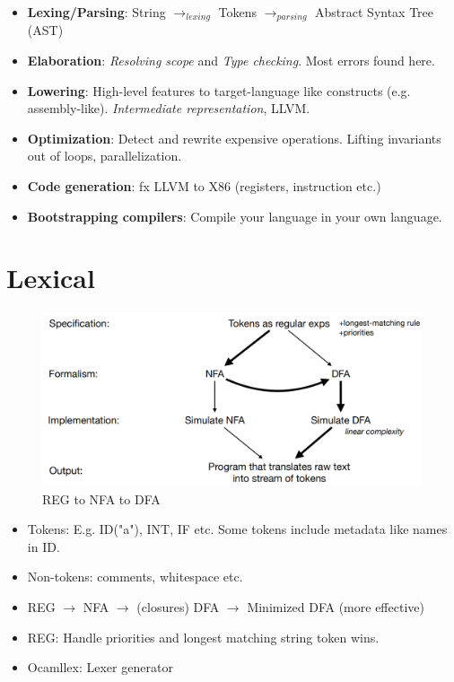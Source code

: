 \documentclass{article}
\begin{document}
\begin{itemize}
    \item \textbf{Lexing/Parsing}: String $\rightarrow_{lexing}$ Tokens $\rightarrow_{parsing}$ Abstract Syntax Tree (AST)
    \item \textbf{Elaboration}: \textit{Resolving scope }and \textit{Type checking}. Most errors found here.
    \item \textbf{Lowering}: High-level features to target-language like constructs (e.g. assembly-like). \textit{Intermediate representation}, LLVM.
    \item \textbf{Optimization}: Detect and rewrite expensive operations. Lifting invariants out of loops, parallelization.
    \item \textbf{Code generation}: fx LLVM to X86 (registers, instruction etc.)
    \item \textbf{Bootstrapping compilers}: Compile your language in your own language.
\end{itemize}

\section{Lexical}

\begin{figure}[h]
    \centering
    \includegraphics[scale=0.4]{assets/reg_nfa_dfa.png}
    \caption{REG to NFA to DFA}
    \label{fig:reg}
\end{figure}

\begin{itemize}
    \item Tokens: E.g. \textsc{ID}("a"), INT, IF etc. Some tokens include metadata like names in ID.
    \item Non-tokens: comments, whitespace etc.
    \item REG $\rightarrow$ NFA $\rightarrow$ (closures) DFA $\rightarrow$ Minimized DFA (more effective)
    \item REG: Handle priorities and longest matching string token wins.
    \item Ocamllex: Lexer generator
\end{itemize}
\end{document}
